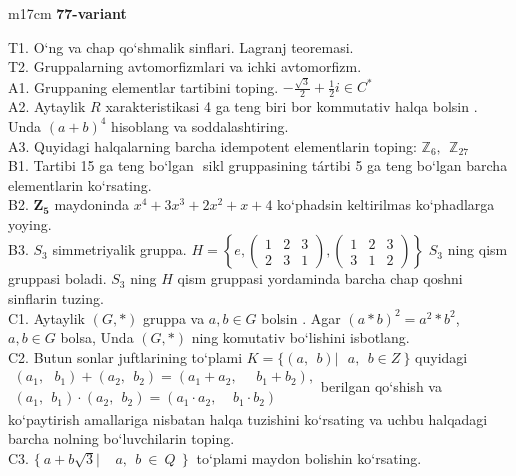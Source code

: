 \documentclass{article}
\begin{document}
\begin{tabular}{m{17cm}}
\textbf{77-variant}
\newline

T1. O`ng va chap qo`shmalik sinflari. Lagranj teoremasi. \\
T2. Gruppalarning avtomorfizmlari va ichki avtomorfizm. \\
A1. Gruppaning elementlar tartibini toping. \(- \frac{\sqrt{3}}{2} + \frac{1}{2}i \in C^{*}\) \\
A2. Aytaylik \(R\) xarakteristikasi 4 ga teng biri bor kommutativ halqa bo\textquotesingle lsin . Unda \((a + b)^{4}\) hisoblang va soddalashtiring. \\
A3. Quyidagi halqalarning barcha idempotent elementlarin toping: \(\mathbb{Z}_{6},\ \ \mathbb{Z}_{27}\) \\
B1. Tartibi 15 ga teng bo`lgan \(< a >\) sikl gruppasining tártibi 5 ga teng bo`lgan barcha elementlarin ko`rsating. \\
B2. \(\mathbf{Z}_{\mathbf{5}}\) maydoninda \(x^{4} + 3x^{3} + 2x^{2} + x + 4\) ko`phadsin keltirilmas ko`phadlarga yoying. \\
B3. \(S_{3}\) simmetriyalik gruppa. \(H = \left\{ e,\begin{pmatrix}
1 & 2 & 3 \\
2 & 3 & 1
\end{pmatrix},\begin{pmatrix}
1 & 2 & 3 \\
3 & 1 & 2
\end{pmatrix} \right\}\) \(S_{3}\) ning qism gruppasi bola\textquotesingle di. \(S_{3}\) ning \(H\) qism gruppasi yordaminda barcha chap qo\textquotesingle shni sinflarin tuzing. \\
C1. Aytaylik \((G,*)\) gruppa va \(a,b \in G\) bo\textquotesingle lsin . Agar \((a*b)^{2} = a^{2}*b^{2}\), \(a,b \in G\) bolsa, Unda \((G,*)\) ning komutativ bo`lishini isbotlang. \\
C2. Butun sonlar juftlarining to`plami \(K = \{(a,\ \ b)\left| \ \ \ a,\ \ b \in Z \right.\ \}\) quyidagi \(\begin{matrix}
(a_{1},\ \ \ b_{1}) + (a_{2},\ \ b_{2}) = (a_{1} + a_{2},\ \ \ \ \ \ b_{1} + b_{2}), \\
(a_{1},\ \ b_{1}) \cdot (a_{2},\ \ b_{2}) = (a_{1} \cdot a_{2},\ \ \ \ \ b_{1} \cdot b_{2})
\end{matrix}\)berilgan qo`shish va ko`paytirish amallariga nisbatan halqa tuzishini ko`rsating va uchbu halqadagi barcha nolning bo`luvchilarin toping. \\
C3. \(\{\ a + b\sqrt{3}\left| \ \ \ \ \ a,\ \ b\  \in \ Q\ \ \} \right.\ \) to`plami maydon bo\textquotesingle lishin ko`rsating. \\

\end{tabular}
\vspace{1cm}
\end{document}
